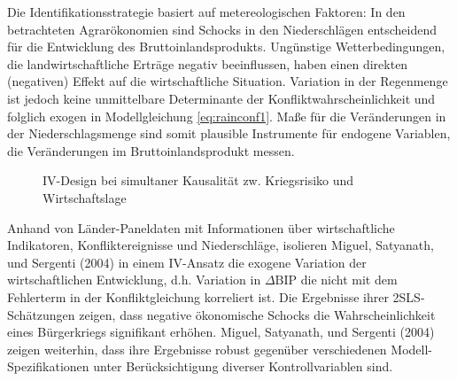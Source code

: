\documentclass[
  a4paper,
  DIV=11,
  oneside]{scrreprt}
\begin{document}
Die Identifikationsstrategie basiert auf metereologischen Faktoren: In
den betrachteten Agrarökonomien sind Schocks in den Niederschlägen
entscheidend für die Entwicklung des Bruttoinlandsprodukts. Ungünstige
Wetterbedingungen, die landwirtschaftliche Erträge negativ beeinflussen,
haben einen direkten (negativen) Effekt auf die wirtschaftliche
Situation. Variation in der Regenmenge ist jedoch keine unmittelbare
Determinante der Konfliktwahrscheinlichkeit und folglich exogen in
Modellgleichung \eqref{eq:rainconf1}. Maße für die Veränderungen in der
Niederschlagsmenge sind somit plausible Instrumente für endogene
Variablen, die Veränderungen im Bruttoinlandsprodukt messen.

\begin{figure}[t]


\caption{\label{fig-IVDAGrain2}IV-Design bei simultaner Kausalität zw.
Kriegsrisiko und Wirtschaftslage}

\end{figure}%

Anhand von Länder-Paneldaten mit Informationen über wirtschaftliche
Indikatoren, Konfliktereignisse und Niederschläge, isolieren Miguel,
Satyanath, und Sergenti (2004) in einem IV-Ansatz die exogene Variation
der wirtschaftlichen Entwicklung, d.h. Variation in \(\Delta\text{BIP}\)
die nicht mit dem Fehlerterm in der Konfliktgleichung korreliert ist.
Die Ergebnisse ihrer 2SLS-Schätzungen zeigen, dass negative ökonomische
Schocks die Wahrscheinlichkeit eines Bürgerkriegs signifikant erhöhen.
Miguel, Satyanath, und Sergenti (2004) zeigen weiterhin, dass ihre
Ergebnisse robust gegenüber verschiedenen Modell-Spezifikationen unter
Berücksichtigung diverser Kontrollvariablen sind.
\end{document}
